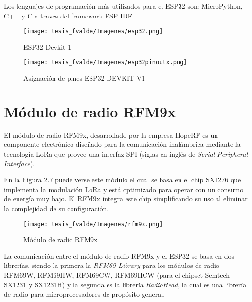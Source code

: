 Los lenguajes de programación más utilizados para el ESP32 son: MicroPython, C++ y C a través del framework ESP-IDF.

\begin{figure}[h]
    \centering
    \texttt{[image: tesis\_fvalde/Imagenes/esp32.png]}
    \caption{ESP32 Devkit 1}
    \label{fig:esp32}
\end{figure}

\begin{figure}[h!]
    \centering
    \texttt{[image: tesis\_fvalde/Imagenes/esp32pinoutx.png]}
    \caption{Asignación de pines ESP32 DEVKIT V1}
    \label{fig:esp32pinout}
\end{figure}


\section{Módulo de radio RFM9x}

El módulo de radio RFM9x, desarrollado por la empresa HopeRF es un componente electrónico diseñado para la comunicación inalámbrica mediante la tecnología LoRa que provee una interfaz SPI (siglas en inglés de \textit{Serial Peripheral Interface}).

\vspace{0.5cm}

En la Figura 2.7 puede verse este módulo el cual se basa en el chip SX1276 que implementa la modulación LoRa y está optimizado para operar con un consumo de energía muy bajo. El RFM9x integra este chip simplificando su uso al eliminar la complejidad de su configuración.

\vspace{0.5cm}

\begin{figure}[h]
    \centering
    \texttt{[image: tesis\_fvalde/Imagenes/rfm9x.png]}
    \caption{Módulo de radio RFM9x}
    \label{fig:adafruit-lora-RFM95W22}
\end{figure}

La comunicación entre el módulo de radio RFM9x y el ESP32 se basa en dos librerías, siendo la primera la \textit{RFM69 Library} para los módulos de radio RFM69W, RFM69HW, RFM69CW, RFM69HCW (para el chipset Semtech SX1231 y SX1231H) y la segunda es la librería \textit{RadioHead}, la cual es una librería de radio para microprocesadores de propósito general. 

\vspace{0.5cm}

